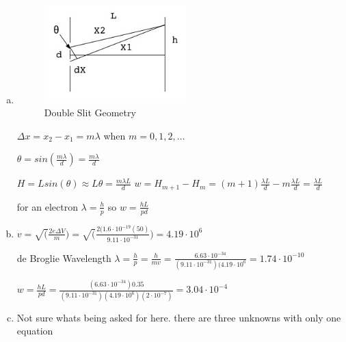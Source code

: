 \documentclass[ps1.tex]{subfiles}
\begin{document}
\begin{enumerate}[(a)]
\item \begin{figure}[ht!]
\centering
\includegraphics[width=55mm]{img/slit_diagram.jpg}
\caption{Double Slit Geometry}
\label{overflow}
\end{figure}
\noindent
$\Delta x = x_2 - x_1 = m\lambda$ when $m = 0, 1, 2, \dots$

$\theta = sin(\frac {m\lambda}{d}) = \frac {m\lambda}{d}$

$H = Lsin(\theta) \approx L\theta = \frac {m\lambda L}{d}$
$ w = H_{m+1} - H_m = (m+1)\frac {\lambda L}{d} - m\frac {\lambda L}{d} = \frac {\lambda L}{d}$

for an electron $\lambda = \frac {h}{p}$ so $w = \frac {hL}{pd}$\\

\noindent\makebox[\linewidth]{\rule{\paperwidth}{0.4pt}}
\item $v = \sqrt(\frac {2e\Delta V}{m}) = \sqrt(\frac {2(1.6\cdot10^{-19}(50)}{9.11\cdot10^{-31}}) = 4.19\cdot10^6$

de Broglie Wavelength $\lambda = \frac {h} {p} = \frac {h}{mv} = \frac {6.63\cdot10^{-34}}{(9.11\cdot10^{-31})(4.19\cdot10^6} = 1.74\cdot10^{-10}$

$w = \frac {hL}{pd} = \frac {(6.63\cdot10^{-34}) 0.35} {(9.11\cdot10^{-31})(4.19\cdot10^6)(2\cdot10^{-7})} = 3.04\cdot10^{-4}$

\noindent\makebox[\linewidth]{\rule{\paperwidth}{0.4pt}}
\item Not sure whats being asked for here.  there are three unknowns with only one equation

\end {enumerate}
\noindent\makebox[\linewidth]{\rule{\paperwidth}{0.4pt}}
\end{document}
